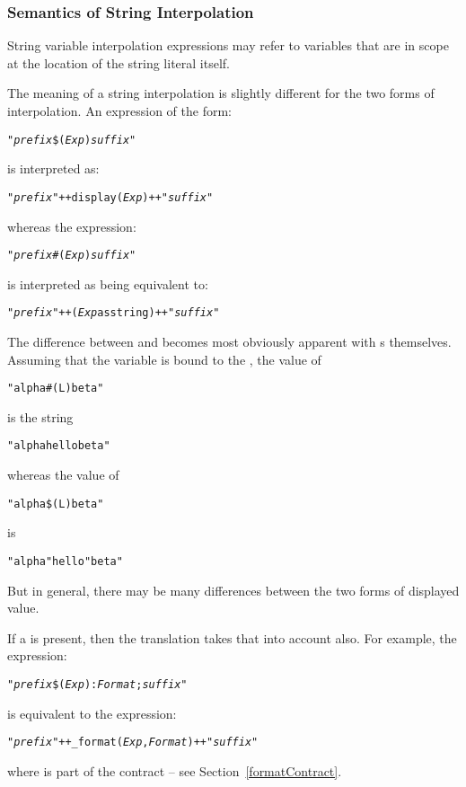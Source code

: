 \subsubsection{Semantics of String Interpolation}

String variable interpolation expressions may refer to variables that are in scope at the location of the string literal itself.

The meaning of a string interpolation is slightly different for the two forms of interpolation. An expression of the form:
\begin{alltt}
"\emph{prefix}\$(\emph{Exp})\emph{suffix}"
\end{alltt}
is interpreted as:
\begin{alltt}
"\emph{prefix}"++display(\emph{Exp})++"\emph{suffix}"
\end{alltt}
whereas the expression:
\begin{alltt}
"\emph{prefix}\#(\emph{Exp})\emph{suffix}"
\end{alltt}
is interpreted as being equivalent to:
\begin{alltt}
"\emph{prefix}"++(\emph{Exp} as string)++"\emph{suffix}"
\end{alltt}

\begin{aside}
The difference between  and  becomes most obviously apparent with s themselves. Assuming that the variable  is bound to the  , the value of 
\begin{alltt}
"alpha\#(L)beta"
\end{alltt}
is the string
\begin{alltt}
"alphahellobeta"
\end{alltt}
whereas the value of 
\begin{alltt}
"alpha\$(L)beta"
\end{alltt}
is
\begin{alltt}
"alpha\bsl"hello\bsl"beta"
\end{alltt}
But in general, there may be many differences between the two forms of displayed value. 
\end{aside}

If a  is present, then the translation takes that into account also. For example, the expression:
\begin{alltt}
"\emph{prefix}\$(\emph{Exp}):\emph{Format};\emph{suffix}"
\end{alltt}
is equivalent to the expression:
\begin{alltt}
"\emph{prefix}"++\_format(\emph{Exp},\emph{Format})++"\emph{suffix}"
\end{alltt}
where  is part of the  contract -- see Section~\vref{formatContract}.

